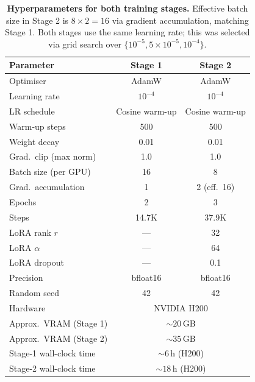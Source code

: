 \documentclass{article}
\begin{document}
\begin{table}[H]
\centering
\caption{\textbf{Hyperparameters for both training stages.}
  Effective batch size in Stage 2 is $8 \times 2 = 16$ via gradient
  accumulation, matching Stage 1.
  Both stages use the same learning rate; this was selected via
  grid search over $\{10^{-5}, 5 \times 10^{-5}, 10^{-4}\}$.}
\small
\begin{tabular}{@{}lcc@{}}
\toprule
\textbf{Parameter} & \textbf{Stage 1} & \textbf{Stage 2} \\
\midrule
Optimiser              & AdamW       & AdamW \\
Learning rate          & $10^{-4}$   & $10^{-4}$ \\
LR schedule            & Cosine warm-up & Cosine warm-up \\
Warm-up steps          & 500         & 500 \\
Weight decay           & 0.01        & 0.01 \\
Grad.\ clip (max norm) & 1.0         & 1.0 \\
Batch size (per GPU)   & 16          & 8 \\
Grad.\ accumulation    & 1           & 2 (eff.\ 16) \\
Epochs                 & 2           & 3 \\
Steps                  & 14.7K       & 37.9K \\
LoRA rank $r$          & ---         & 32 \\
LoRA $\alpha$          & ---         & 64 \\
LoRA dropout           & ---         & 0.1 \\
Precision              & bfloat16    & bfloat16 \\
Random seed            & 42          & 42 \\
\midrule
Hardware               & \multicolumn{2}{c}{NVIDIA H200} \\
Approx.\ VRAM (Stage 1)& \multicolumn{2}{c}{${\sim}20$\,GB} \\
Approx.\ VRAM (Stage 2)& \multicolumn{2}{c}{${\sim}35$\,GB} \\
Stage-1 wall-clock time & \multicolumn{2}{c}{${\sim}6$\,h (H200)} \\
Stage-2 wall-clock time & \multicolumn{2}{c}{${\sim}18$\,h (H200)} \\
\bottomrule
\end{tabular}
\end{table}
\end{document}
